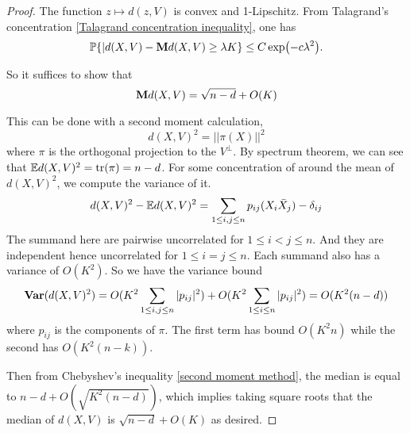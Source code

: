\begin{proof}
    The function $z\mapsto d(z, V)$ is convex and 1-Lipschitz. From Talagrand's concentration \ref{Talagrand concentration inequality}, one has
    \begin{equation*}
        \mathbb{P}\{|d(X,V)-\mathbf{M} d(X,V)\geq \lambda K\} \leq C\exp(-c\lambda^2).
    \end{equation*}

    So it suffices to show that
    \begin{equation*}
        \mathbf{M} d(X,V) = \sqrt{n-d} +O(K)
    \end{equation*}

    This can be done with a second moment calculation, 
    \begin{equation*}
        d(X,V)^2 = ||\pi (X)||^2
    \end{equation*}
    where $\pi$ is the orthogonal projection to the $V^\bot$.
    By spectrum theorem, we can see that $\mathbb{E} d(X,V)^2 = \mathrm{tr} (\pi) = n-d$. For some concentration of around the mean of $d(X,V)^2$, we compute the variance of it.
    \begin{equation*}
        d(X,V)^2 -\mathbb{E} d(X,V)^2 = \sum_{1\leq i,j\leq n} p_{ij}(X_i\bar X_j)-\delta_{ij}
    \end{equation*}
    The summand here are pairwise uncorrelated for $1\leq i <j\leq n$. And they are independent hence uncorrelated for $1\leq i=j\leq n$. Each summand also has a variance of $O(K^2)$. So we have the variance bound
    \begin{equation*}
        \mathbf{Var} (d(X,V)^2) = O(K^2 \sum_{1\leq i,j\leq n}|p_{ij}|^2) +O(K^2 \sum_{1\leq i\leq n}|p_{ij}|^2) = O(K^2(n-d))
    \end{equation*}
    where $p_{ij}$ is the components of $\pi$. The first term has bound $O(K^2 n)$ while the second has $O(K^2(n-k))$.

    Then from Chebyshev's inequality \ref{second moment method}, the median is equal to $n-d+O(\sqrt{K^2 (n-d)})$, which implies taking square roots that the median of $d(X,V)$ is $\sqrt{n-d}+O(K)$ as desired.
\end{proof}
